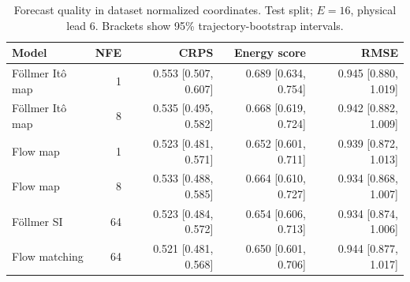 \begin{table}[t]
\centering
\small
\setlength{\tabcolsep}{3pt}
\caption{Forecast quality in dataset normalized coordinates. Test split; $E=16$, physical lead 6. Brackets show 95\% trajectory-bootstrap intervals.}
\label{tab:map-quality}
\begin{tabular}{lrrrr}
\toprule
Model & NFE & CRPS & Energy score & RMSE \\
\midrule
Föllmer Itô map & 1 & 0.553 [0.507, 0.607] & 0.689 [0.634, 0.754] & 0.945 [0.880, 1.019] \\
Föllmer Itô map & 8 & 0.535 [0.495, 0.582] & 0.668 [0.619, 0.724] & 0.942 [0.882, 1.009] \\
\addlinespace
Flow map & 1 & 0.523 [0.481, 0.571] & 0.652 [0.601, 0.711] & 0.939 [0.872, 1.013] \\
Flow map & 8 & 0.533 [0.488, 0.585] & 0.664 [0.610, 0.727] & 0.934 [0.868, 1.007] \\
\addlinespace
Föllmer SI & 64 & 0.523 [0.484, 0.572] & 0.654 [0.606, 0.713] & 0.934 [0.874, 1.006] \\
\addlinespace
Flow matching & 64 & 0.521 [0.481, 0.568] & 0.650 [0.601, 0.706] & 0.944 [0.877, 1.017] \\
\bottomrule
\end{tabular}
\end{table}

